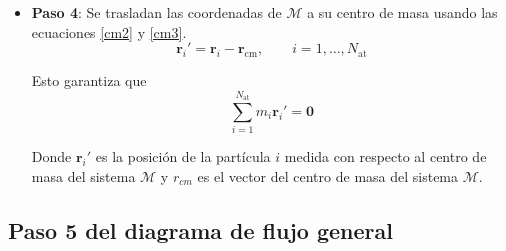 \begin{itemize}
		
		\item \textbf{Paso 4}: Se trasladan las coordenadas de $\mathcal{M}$ a su centro de masa usando las ecuaciones \ref{cm2} y \ref{cm3}.
		\begin{equation}
			\mathbf{r}_i' = \mathbf{r}_i - \mathbf{r}_{\text{cm}}, \qquad
			i=1,\dots,N_{\text{at}}
			\label{cm2}
		\end{equation}
		
		Esto garantiza que
		\begin{equation}
			\sum_{i=1}^{N_{\text{at}}} m_i \mathbf{r}_i' = \mathbf{0}
			\label{cm3}
		\end{equation} 
		
		Donde $\mathbf{r}_i'$ es la posici\'{o}n de la part\'{i}cula $i$ medida 
		con respecto al centro de masa del sistema $\mathcal{M}$ y 
		$r_{cm}$ es el vector del centro de masa del sistema $\mathcal{M}$.
		
		
	\end{itemize}


	\subsection{Paso 5 del diagrama de flujo general}
	
